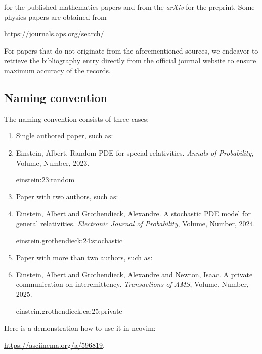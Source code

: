 \documentclass[a4paper,11pt]{article}
\begin{document}
\noindent for the published mathematics papers and from the \textit{arXiv} for
the preprint. Some physics papers are obtained from
\begin{center}
  \url{https://journals.aps.org/search/}
\end{center}


\noindent For papers that do not originate from the aforementioned sources, we
endeavor to retrieve the bibliography entry directly from the official journal
website to ensure maximum accuracy of the records.


\subsection{Naming convention}

The naming convention consists of three cases:
\begin{enumerate}
  \item Single authored paper, such as:
  \item[] Einstein, Albert. Random PDE for special relativities.
    \textit{Annals of Probability}, Volume, Number, 2023.
    \begin{center}
      einstein:23:random
    \end{center}
    \bigskip

  \item Paper with two authors, such as:
  \item[] Einstein, Albert and Grothendieck, Alexandre. A stochastic PDE
    model for general relativities. \textit{Electronic Journal of Probability},
    Volume, Number, 2024.
    \begin{center}
      einstein.grothendieck:24:stochastic
    \end{center}

  \item Paper with more than two authors, such as:
  \item[] Einstein, Albert and Grothendieck, Alexandre and Newton, Isaac.
    A private communication on interemittency. \textit{Transactions of AMS},
    Volume, Number, 2025.
    \begin{center}
      einstein.grothendieck.ea:25:private
    \end{center}
\end{enumerate}
\bigskip

Here is a demonstration how to use it in neovim:
\begin{center}
  \url{https://asciinema.org/a/596819}.
\end{center}
\end{document}
